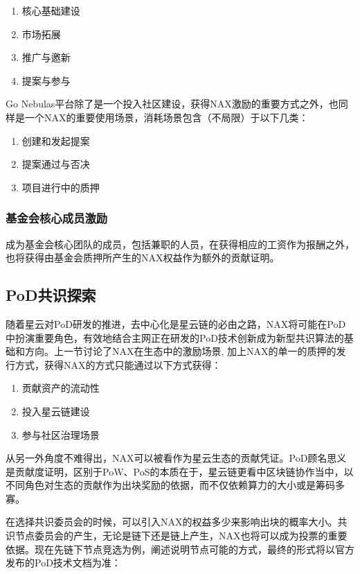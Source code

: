 \begin{enumerate}[\hspace{1cm}(a)]
  \item 核心基础建设
  \item 市场拓展
  \item 推广与邀新
  \item 提案与参与
\end{enumerate}

Go Nebulas平台除了是一个投入社区建设，获得NAX激励的重要方式之外，也同样是一个NAX的重要使用场景，消耗场景包含（不局限）于以下几类：
\begin{enumerate}[\hspace{1cm}(a)]
  \item 创建和发起提案
  \item 提案通过与否决
  \item 项目进行中的质押
\end{enumerate}

\subsubsection{基金会核心成员激励}
成为基金会核心团队的成员，包括兼职的人员，在获得相应的工资作为报酬之外，也将获得由基金会质押所产生的NAX权益作为额外的贡献证明。

\subsection{PoD共识探索}
随着星云对PoD研发的推进，去中心化是星云链的必由之路，NAX将可能在PoD中扮演重要角色，有效地结合主网正在研发的PoD技术创新成为新型共识算法的基础和方向。上一节讨论了NAX在生态中的激励场景, 加上NAX的单一的质押的发行方式，获得NAX的方式只能通过以下方式获得：
\begin{enumerate}[\hspace{1cm}(i)]
  \item 贡献资产的流动性
  \item 投入星云链建设
  \item 参与社区治理场景
\end{enumerate}

从另一外角度不难得出，NAX可以被看作为星云生态的贡献凭证。PoD顾名思义是贡献度证明，区别于PoW、PoS的本质在于，星云链更看中区块链协作当中，以不同角色对生态的贡献作为出块奖励的依据，而不仅依赖算力的大小或是筹码多寡。

在选择共识委员会的时候，可以引入NAX的权益多少来影响出块的概率大小。共识节点委员会的产生，无论是链下还是链上产生，NAX也将可以成为投票的重要依据。现在先链下节点竞选为例，阐述说明节点可能的方式，最终的形式将以官方发布的PoD技术文档为准：

